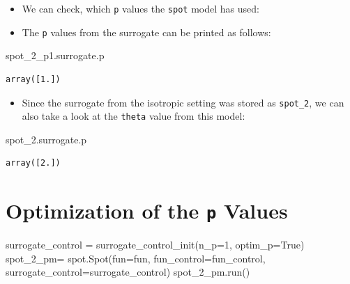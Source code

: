 \documentclass[
  letterpaper,
  DIV=11,
  numbers=noendperiod]{scrreprt}
\newenvironment{Shaded}{\begin{snugshade}}{\end{snugshade}}
\newcommand{\DecValTok}[1]{\textcolor[rgb]{0.68,0.00,0.00}{#1}}
\newcommand{\NormalTok}[1]{\textcolor[rgb]{0.00,0.23,0.31}{#1}}
\newcommand{\OperatorTok}[1]{\textcolor[rgb]{0.37,0.37,0.37}{#1}}
\newcommand{\VariableTok}[1]{\textcolor[rgb]{0.07,0.07,0.07}{#1}}
\providecommand{\tightlist}{%
  \setlength{\itemsep}{0pt}\setlength{\parskip}{0pt}}\usepackage{longtable,booktabs,array}
\begin{document}
\begin{itemize}
\tightlist
\item
  We can check, which \texttt{p} values the \texttt{spot} model has
  used:
\item
  The \texttt{p} values from the surrogate can be printed as follows:
\end{itemize}

\begin{Shaded}
\begin{Highlighting}[]
\NormalTok{spot\_2\_p1.surrogate.p}
\end{Highlighting}
\end{Shaded}

\begin{verbatim}
array([1.])
\end{verbatim}

\begin{itemize}
\tightlist
\item
  Since the surrogate from the isotropic setting was stored as
  \texttt{spot\_2}, we can also take a look at the \texttt{theta} value
  from this model:
\end{itemize}

\begin{Shaded}
\begin{Highlighting}[]
\NormalTok{spot\_2.surrogate.p}
\end{Highlighting}
\end{Shaded}

\begin{verbatim}
array([2.])
\end{verbatim}

\section{\texorpdfstring{Optimization of the \texttt{p}
Values}{Optimization of the p Values}}\label{optimization-of-the-p-values}

\begin{Shaded}
\begin{Highlighting}[]
\NormalTok{surrogate\_control }\OperatorTok{=}\NormalTok{ surrogate\_control\_init(n\_p}\OperatorTok{=}\DecValTok{1}\NormalTok{,}
\NormalTok{                                           optim\_p}\OperatorTok{=}\VariableTok{True}\NormalTok{)}
\NormalTok{spot\_2\_pm}\OperatorTok{=}\NormalTok{ spot.Spot(fun}\OperatorTok{=}\NormalTok{fun,}
\NormalTok{                    fun\_control}\OperatorTok{=}\NormalTok{fun\_control,}
\NormalTok{                    surrogate\_control}\OperatorTok{=}\NormalTok{surrogate\_control)}
\NormalTok{spot\_2\_pm.run()}
\end{Highlighting}
\end{Shaded}
\end{document}
